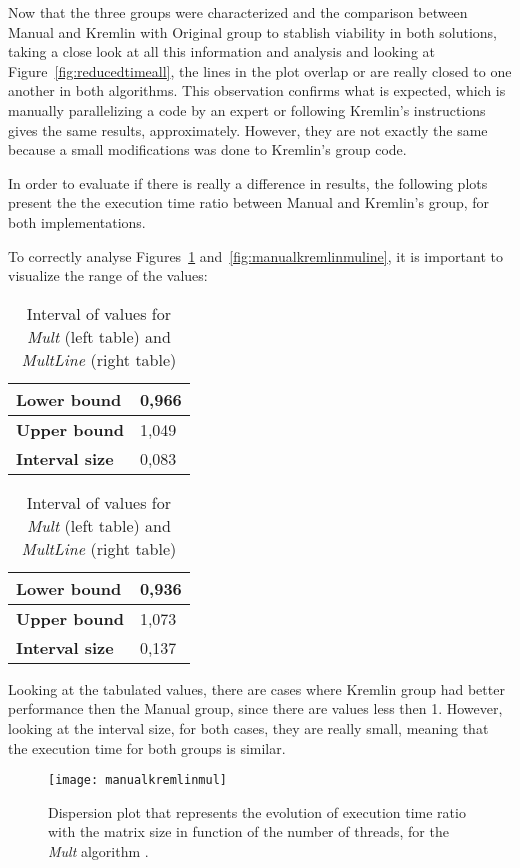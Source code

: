 Now that the three groups were characterized and the comparison between Manual and Kremlin with Original group to stablish viability in both solutions, taking a close look at all this information and analysis and looking at Figure~\ref{fig:reducedtimeall}, the lines in the plot overlap or are really closed to one another in both algorithms. This observation confirms what is expected, which is manually parallelizing a code by an expert or following Kremlin's instructions gives the same results, approximately. However, they are not exactly the same because a small modifications was done to Kremlin's group code. 

In order to evaluate if there is really a difference in results, the following plots present the the execution time ratio between Manual and Kremlin's group, for both implementations.

To correctly analyse Figures~\ref{fig:manualkremlinmul} and~\ref{fig:manualkremlinmuline}, it is important to visualize the range of the values:

\begin{table}[htb]
	\centering
	\caption{Interval of values for \textit{Mult} (left table) and \textit{MultLine} (right table)}
	\begin{tabular}{ |l|l| }
		\hline
		\textbf{Lower bound} & 0,966\\ \hline
		\textbf{Upper bound} & 1,049 \\ \hline
		\textbf{Interval size} & 0,083 \\
		\hline
	\end{tabular}
	\quad
	\begin{tabular}{ |l|l| }
		\hline
		\textbf{Lower bound} & 0,936 \\ \hline
		\textbf{Upper bound} & 1,073 \\ \hline
		\textbf{Interval size} & 0,137 \\
		\hline
	\end{tabular}
\end{table}

Looking at the tabulated values, there are cases where Kremlin group had better performance then the Manual group, since there are values less then 1. However, looking at the interval size, for both cases, they are really small, meaning that the execution time for both groups is similar.


\begin{figure}[htb]
	\begin{center}
		\leavevmode
		\texttt{[image: manualkremlinmul]}
		\caption{Dispersion plot that represents the evolution of execution time ratio with the matrix size in function of the number of threads, for the \textit{Mult} algorithm .}
		\label{fig:manualkremlinmul}
	\end{center}
\end{figure}

